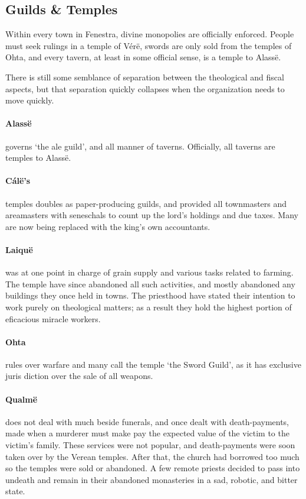 \begin{multicols}{2}

\subsection{Guilds \& Temples}

Within every town in Fenestra, divine monopolies are officially enforced.
People must seek rulings in a temple of V\'{e}r\"{e}, swords are only sold from the temples of Ohta, and every tavern, at least in some official sense, is a temple to Alass\"{e}.

There is still some semblance of separation between the theological and fiscal aspects, but that separation quickly collapses when the organization needs to move quickly.

\paragraph{Alass\"{e}} governs `the ale guild', and all manner of taverns.  Officially, all taverns are temples to Alass\"{e}.

\paragraph{C\'{a}l\"{e}'s} temples doubles as paper-producing guilds, and provided all townmasters and areamasters with seneschals to count up the lord's holdings and due taxes.
Many are now being replaced with the \gls{king}'s own accountants.

\paragraph{Laiqu\"{e}} was at one point in charge of grain supply and various tasks related to farming.
The temple have since abandoned all such activities, and mostly abandoned any buildings they once held in towns.
The priesthood have stated their intention to work purely on theological matters; as a result they hold the highest portion of eficacious miracle workers.

\paragraph{Ohta} rules over warfare and many call the temple `the Sword Guild', as it has exclusive juris diction over the sale of all weapons.

\paragraph{Qualm\"{e}} does not deal with much beside funerals, and once dealt with death-payments, made when a murderer must make pay the expected value of the victim to the victim's family.
These services were not popular, and death-payments were soon taken over by the Verean temples.
After that, the church had borrowed too much so the temples were sold or abandoned.
A few remote priests decided to pass into undeath and remain in their abandoned monasteries in a sad, robotic, and bitter state.


\end{multicols}
